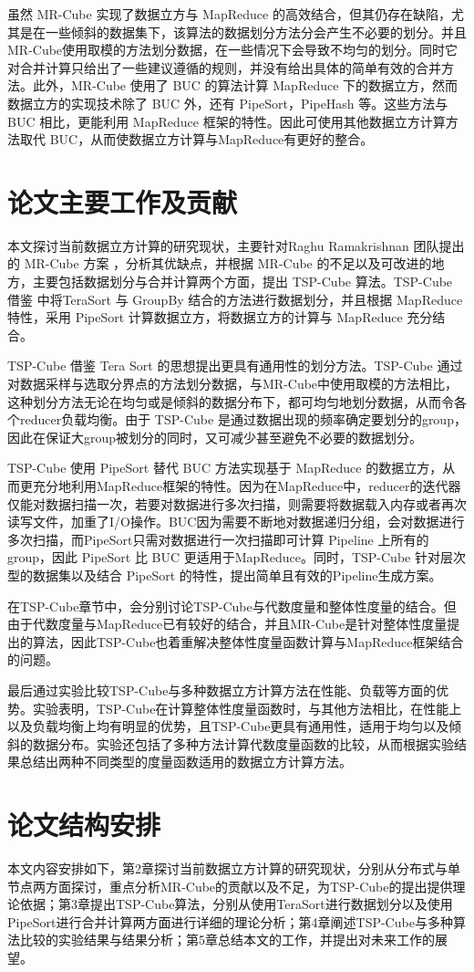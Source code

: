 虽然 MR-Cube 实现了数据立方与 MapReduce 的高效结合，但其仍存在缺陷，尤其是在一些倾斜的数据集下，该算法的数据划分方法分会产生不必要的划分。并且MR-Cube使用取模的方法划分数据，在一些情况下会导致不均匀的划分。同时它对合并计算只给出了一些建议遵循的规则，并没有给出具体的简单有效的合并方法。此外，MR-Cube 使用了 BUC \cite{beyer1999bottom} 的算法计算 MapReduce 下的数据立方，然而数据立方的实现技术除了 BUC 外，还有 PipeSort，PipeHash \cite{agarwal1996computation} 等。这些方法与 BUC 相比，更能利用 MapReduce 框架的特性。因此可使用其他数据立方计算方法取代 BUC，从而使数据立方计算与MapReduce有更好的整合。

\section{论文主要工作及贡献}

本文探讨当前数据立方计算的研究现状，主要针对Raghu Ramakrishnan 团队提出的 MR-Cube 方案 \cite{nandi2012data} \cite{nandi2011distributed}，分析其优缺点，并根据 MR-Cube 的不足以及可改进的地方，主要包括数据划分与合并计算两个方面，提出 TSP-Cube 算法。TSP-Cube 借鉴\cite{tao2013minimal} 中将TeraSort 与 GroupBy 结合的方法进行数据划分，并且根据 MapReduce 特性，采用 PipeSort 计算数据立方，将数据立方的计算与 MapReduce 充分结合。

TSP-Cube 借鉴 Tera Sort 的思想提出更具有通用性的划分方法。TSP-Cube 通过对数据采样与选取分界点的方法划分数据，与MR-Cube中使用取模的方法相比，这种划分方法无论在均匀或是倾斜的数据分布下，都可均匀地划分数据，从而令各个reducer负载均衡。由于 TSP-Cube 是通过数据出现的频率确定要划分的group，因此在保证大group被划分的同时，又可减少甚至避免不必要的数据划分。

TSP-Cube 使用 PipeSort 替代 BUC 方法实现基于 MapReduce 的数据立方，从而更充分地利用MapReduce框架的特性。因为在MapReduce中，reducer的迭代器仅能对数据扫描一次，若要对数据进行多次扫描，则需要将数据载入内存或者再次读写文件，加重了I/O操作。BUC因为需要不断地对数据递归分组，会对数据进行多次扫描，而PipeSort只需对数据进行一次扫描即可计算 Pipeline 上所有的group，因此 PipeSort 比 BUC 更适用于MapReduce。同时，TSP-Cube 针对层次型的数据集以及结合 PipeSort 的特性，提出简单且有效的Pipeline生成方案。

在TSP-Cube章节中，会分别讨论TSP-Cube与代数度量和整体性度量的结合。但由于代数度量与MapReduce已有较好的结合，并且MR-Cube是针对整体性度量提出的算法，因此TSP-Cube也着重解决整体性度量函数计算与MapReduce框架结合的问题。

最后通过实验比较TSP-Cube与多种数据立方计算方法在性能、负载等方面的优势。实验表明，TSP-Cube在计算整体性度量函数时，与其他方法相比，在性能上以及负载均衡上均有明显的优势，且TSP-Cube更具有通用性，适用于均匀以及倾斜的数据分布。实验还包括了多种方法计算代数度量函数的比较，从而根据实验结果总结出两种不同类型的度量函数适用的数据立方计算方法。


\section{论文结构安排}
本文内容安排如下，第2章探讨当前数据立方计算的研究现状，分别从分布式与单节点两方面探讨，重点分析MR-Cube的贡献以及不足，为TSP-Cube的提出提供理论依据；第3章提出TSP-Cube算法，分别从使用TeraSort进行数据划分以及使用PipeSort进行合并计算两方面进行详细的理论分析；第4章阐述TSP-Cube与多种算法比较的实验结果与结果分析；第5章总结本文的工作，并提出对未来工作的展望。

